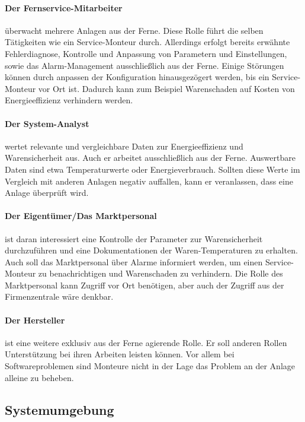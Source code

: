 \documentclass[11pt,a4paper]{report}
\begin{document}
\paragraph{Der Fernservice-Mitarbeiter} überwacht mehrere Anlagen aus der Ferne. Diese Rolle führt die selben Tätigkeiten wie ein Service-Monteur durch. Allerdings erfolgt bereits erwähnte Fehlerdiagnose, Kontrolle und Anpassung von Parametern und Einstellungen, sowie das Alarm-Management ausschließlich aus der Ferne. Einige Störungen können durch anpassen der Konfiguration hinausgezögert werden, bis ein Service-Monteur vor Ort ist. Dadurch kann zum Beispiel Warenschaden auf Kosten von Energieeffizienz verhindern werden.

\paragraph{Der System-Analyst} wertet relevante und vergleichbare Daten zur Energieeffizienz und Warensicherheit aus. Auch er arbeitet ausschließlich aus der Ferne. Auswertbare Daten sind etwa Temperaturwerte oder Energieverbrauch. Sollten diese Werte im Vergleich mit anderen Anlagen negativ auffallen, kann er veranlassen, dass eine Anlage überprüft wird.

\paragraph{Der Eigentümer/Das Marktpersonal} ist daran interessiert eine Kontrolle der Parameter zur Warensicherheit durchzuführen und eine Dokumentationen der Waren-Temperaturen zu erhalten. Auch soll das Marktpersonal über Alarme informiert werden, um einen Service-Monteur zu benachrichtigen und Warenschaden zu verhindern. Die Rolle des Marktpersonal kann Zugriff vor Ort benötigen, aber auch der Zugriff aus der Firmenzentrale wäre denkbar.

\paragraph{Der Hersteller} ist eine weitere exklusiv aus der Ferne agierende Rolle. Er soll anderen Rollen Unterstützung bei ihren Arbeiten leisten können. Vor allem bei Softwareproblemen sind Monteure nicht in der Lage das Problem an der Anlage alleine zu beheben.

\subsection{Systemumgebung}
\end{document}
